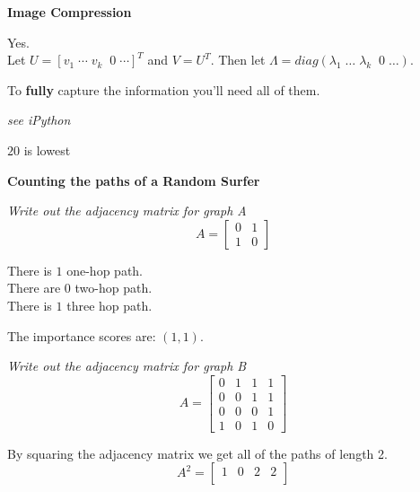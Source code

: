 \documentclass[letter]{article}
\newenvironment{menumerate}{\edef\backupindent{\the\parindent}
  \enumerate\setlength{\parindent}{\backupindent}}
  {\endenumerate}
\begin{document}
\begin{menumerate}
\begin{menumerate}
    \end{menumerate}

    \newpage
	\item \textbf{Image Compression}
	\begin{menumerate}
		\item Yes.
		\\Let $U = [v_1\; \cdots \; v_k \;\; 0 \; \cdots]^T$ and $V = U^T.$ Then let $\Lambda = diag(\lambda_1\; \dots\; \lambda_k\;\; 0\; \dots).$
		\item To \textbf{fully} capture the information you'll need all of them.
		\item \emph{see iPython}
		\item $20$ is lowest
	\end{menumerate}

	\newpage
	\item \textbf{Counting the paths of a Random Surfer}
	\begin{menumerate}
		\item  \emph{Write out the adjacency matrix for graph A}
		\begin{equation*}
			A = \begin{bmatrix}
				0 & 1 \\
				1 & 0
			\end{bmatrix}
		\end{equation*}
		\item There is $1$ one-hop path. \\There are $0$ two-hop path. \\There is $1$ three hop path.
        \item The importance scores are: $(1,1)$.
        \item \emph{Write out the adjacency matrix for graph B}
        \begin{equation*}
            A = \begin{bmatrix}
                0 & 1 & 1 & 1\\
                0 & 0 & 1 & 1\\
                0 & 0 & 0 & 1\\
                1 & 0 & 1 & 0
            \end{bmatrix}
        \end{equation*}
        \item By squaring the adjacency matrix we get all of the paths of length 2.
        \begin{equation*}
            A^2 = \begin{bmatrix}
                1 & 0 & 2 & 2 \\

\end{bmatrix}
\end{equation*}
\end{menumerate}
\end{menumerate}
\end{document}
